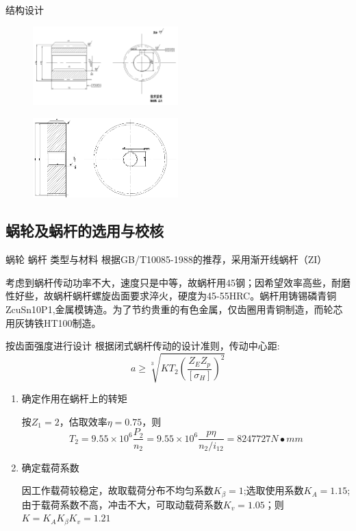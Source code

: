 \documentclass[12pt,xcolor={rgb}]{beamer}
\begin{document}
\begin{frame}{结构设计}
\begin{figure}[htb]
	\begin{center} 
		\includegraphics[width=0.5\textwidth]{images/3}
	\end{center}
\end{figure}
\begin{figure}[htb]
	\begin{center} 
		\includegraphics[width=0.5\textwidth]{images/4}
	\end{center}
\end{figure}
\end{frame}

\subsection{蜗轮及蜗杆的选用与校核}

\begin{frame}{蜗轮 蜗杆 类型与材料}
根据GB/T10085-1988的推荐，采用渐开线蜗杆（ZI）

考虑到蜗杆传动功率不大，速度只是中等，故蜗杆用45钢；因希望效率高些，耐磨性好些，故蜗杆蜗杆螺旋齿面要求淬火，硬度为45-55HRC。蜗杆用铸锡磷青铜ZcuSn10P1,金属模铸造。为了节约贵重的有色金属，仅齿圈用青铜制造，而轮芯用灰铸铁HT100制造。
\end{frame}

\begin{frame}{按齿面强度进行设计}
根据闭式蜗杆传动的设计准则，传动中心距:
$$a\geq \sqrt[3]{KT_2\left( \frac{Z_EZ_p}{[\sigma _H]} \right)^2 }$$
\begin{enumerate}[]
	\item 确定作用在蜗杆上的转矩
	
	按$Z_1=2$，估取效率$ \eta =0.75$，则
	$$ T_2=9.55\times 10^6 \frac{P_2}{n_2} =9.55\times 10^6 \frac{p\eta }{n_2/i_{12}}=8247727 N\bullet mm$$
	\item 确定载荷系数
	
	因工作载荷较稳定，故取载荷分布不均匀系数$K_\beta=1$;选取使用系数$K_A=1.15$;由于载荷系数不高，冲击不大，可取动载荷系数$K_v=1.05$；则
	$K=K_A K_\beta K_v=1.21$

\end{enumerate}

\end{frame}
\end{document}
